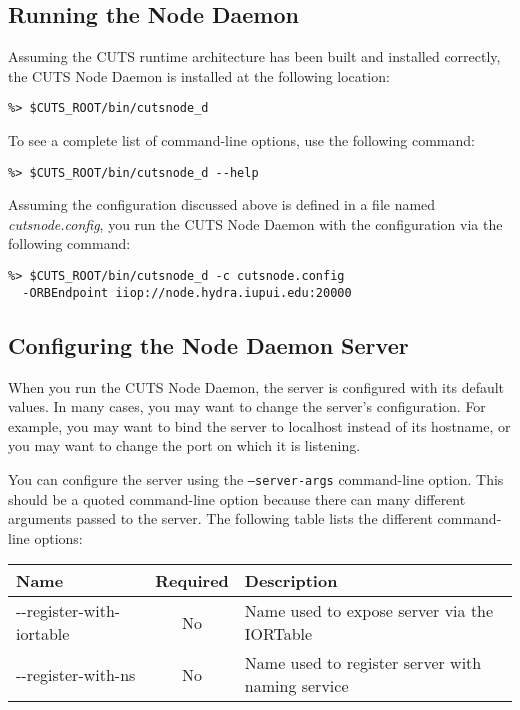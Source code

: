 \subsection{Running the Node Daemon}
\label{sec:node-daemon-config}

Assuming the CUTS runtime architecture has been built and installed 
correctly, the CUTS Node Daemon is installed at the following 
location:
\begin{lstlisting}
%> $CUTS_ROOT/bin/cutsnode_d
\end{lstlisting}
To see a complete list of command-line options, use the following 
command:
\begin{lstlisting}
%> $CUTS_ROOT/bin/cutsnode_d --help
\end{lstlisting}
Assuming the configuration discussed above is defined in a file 
named \textit{cutsnode.config}, you run the CUTS Node Daemon with
the configuration via the following command: 
\begin{lstlisting}
%> $CUTS_ROOT/bin/cutsnode_d -c cutsnode.config 
  -ORBEndpoint iiop://node.hydra.iupui.edu:20000
\end{lstlisting}

\subsection{Configuring the Node Daemon Server}
\label{sec:node-daemon-server}

When you run the CUTS Node Daemon, the server is configured with 
its default values. In many cases, you may want to change
the server's configuration. For example, you may want to bind the
server to localhost instead of its hostname, or you may want to change
the port on which it is listening.

You can configure the server using the \texttt{--server-args}
command-line option. This should be a quoted command-line option because
there can many different arguments passed to the server. The following
table lists the different command-line options:
\begin{table}[h]
  \begin{tabular}{lcl}
  \hline
  \textbf{Name} & \textbf{Required} & \textbf{Description} \\
  \hline
  -\--register-with-iortable & No & Name used to expose server via the IORTable \\
  -\--register-with-ns & No & Name used to register server with naming service \\
  \end{tabular}
\end{table}

